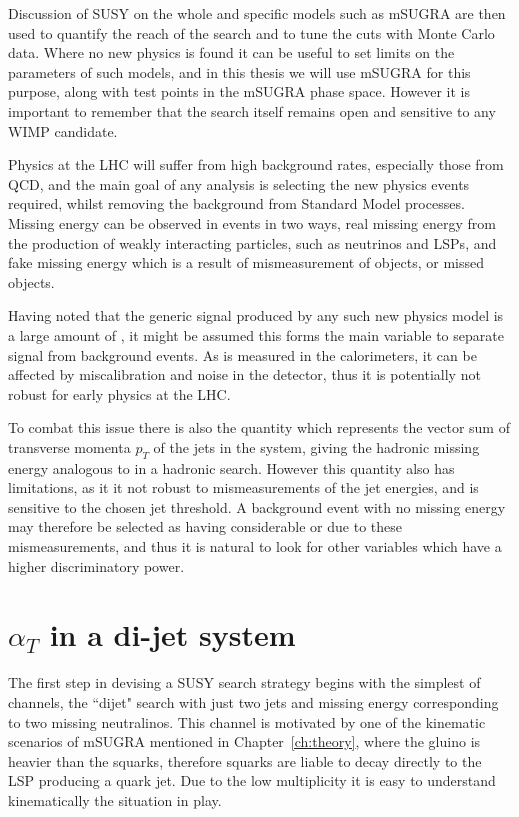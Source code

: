 Discussion of SUSY on the whole and specific models such as mSUGRA are then used to quantify the reach of the search and to tune the cuts with Monte Carlo data. Where no new physics is found it can be useful to set limits on the parameters of such models, and in this thesis we will use mSUGRA for this purpose, along with test points in the mSUGRA phase space. However it is important to remember that the search itself remains open and sensitive to any WIMP candidate. 

Physics at the LHC will suffer from high background rates, especially those from QCD, and the main goal of any analysis is selecting the new physics events required, whilst removing the background from Standard Model processes. Missing energy can be observed in events in two ways, real missing energy from the production of weakly interacting particles, such as neutrinos and LSPs, and fake missing energy which is a result of mismeasurement of objects, or missed objects. 

Having noted that the generic signal produced by any such new physics model is a large amount of \met, it might be assumed this forms the main variable to separate signal from background events. As \met is measured in the calorimeters, it can be affected by miscalibration and noise in the detector, thus it is potentially not robust for early physics at the LHC. 

To combat this issue there is also the quantity \mht which represents the vector sum of transverse momenta $p_{T}$ of the jets in the system, giving the hadronic missing energy analogous to \met in a hadronic search. However this quantity also has limitations, as it it not robust to mismeasurements of the jet energies, and is sensitive to the chosen jet threshold. A background event with no missing energy may therefore be selected as having considerable \met or \mht due to these mismeasurements, and thus it is natural to look for other variables which have a higher discriminatory power. 


\section{$\alpha_{T}$ in a di-jet system}

The first step in devising a SUSY search strategy begins with the simplest of channels, the ``dijet" search with just two jets and missing energy corresponding to two missing neutralinos.  This channel is motivated by one of the kinematic scenarios of mSUGRA mentioned in Chapter~\ref{ch:theory}, where the gluino is heavier than the squarks, therefore squarks are liable to decay directly to the LSP producing a quark jet. Due to the low multiplicity it is easy to understand kinematically the situation in play. 

